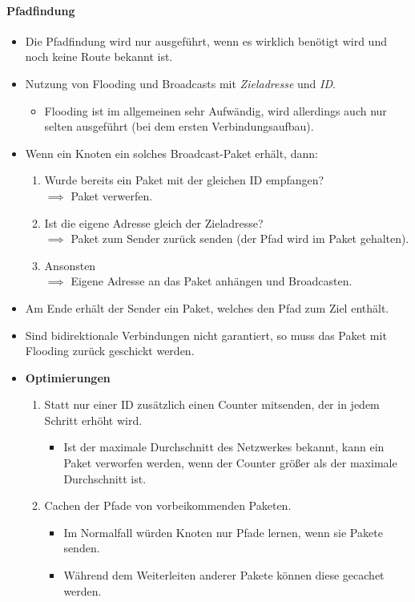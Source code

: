 \documentclass[a4paper, 11pt, accentcolor = tud3b]{tudreport}
\begin{document}
			    \paragraph{Pfadfindung}
				    \begin{itemize}
				    	\item Die Pfadfindung wird nur ausgeführt, wenn es wirklich benötigt wird und noch keine Route bekannt ist.
				    	\item Nutzung von Flooding und Broadcasts mit \textit{Zieladresse} und \textit{ID}.
					    	\begin{itemize}
					    		\item Flooding ist im allgemeinen sehr Aufwändig, wird allerdings auch nur selten ausgeführt (bei dem ersten Verbindungsaufbau).
					    	\end{itemize}
				    	\item Wenn ein Knoten ein solches Broadcast-Paket erhält, dann:
					    	\begin{enumerate}
					    		\item Wurde bereits ein Paket mit der gleichen ID empfangen? \\ \( \implies \) Paket verwerfen.
					    		\item Ist die eigene Adresse gleich der Zieladresse? \\ \( \implies \) Paket zum Sender zurück senden (der Pfad wird im Paket gehalten).
					    		\item Ansonsten \\ \( \implies \) Eigene Adresse an das Paket anhängen und Broadcasten.
					    	\end{enumerate}
					    \item Am Ende erhält der Sender ein Paket, welches den Pfad zum Ziel enthält.
					    \item Sind bidirektionale Verbindungen nicht garantiert, so muss das Paket mit Flooding zurück geschickt werden.
					    \item \textbf{Optimierungen}
						    \begin{enumerate}
						    	\item Statt nur einer ID zusätzlich einen Counter mitsenden, der in jedem Schritt erhöht wird.
							    	\begin{itemize}
							    		\item Ist der maximale Durchschnitt des Netzwerkes bekannt, kann ein Paket verworfen werden, wenn der Counter größer als der maximale Durchschnitt ist.
							    	\end{itemize}
							    \item Cachen der Pfade von vorbeikommenden Paketen.
								    \begin{itemize}
								    	\item Im Normalfall würden Knoten nur Pfade lernen, wenn sie Pakete senden.
								    	\item Während dem Weiterleiten anderer Pakete können diese gecachet werden.
								    \end{itemize}
						    \end{enumerate}
				    \end{itemize}
			    
\end{document}
